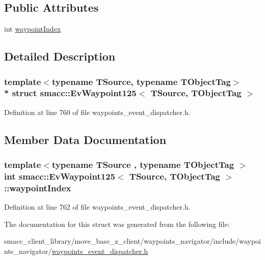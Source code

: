 \subsection*{Public Attributes}
\begin{DoxyCompactItemize}
\item 
int \hyperlink{structsmacc_1_1EvWaypoint125_a2131ce9d50a0a86de527c9bcf547a1f9}{waypoint\+Index}
\end{DoxyCompactItemize}


\subsection{Detailed Description}
\subsubsection*{template$<$typename T\+Source, typename T\+Object\+Tag$>$\\*
struct smacc\+::\+Ev\+Waypoint125$<$ T\+Source, T\+Object\+Tag $>$}



Definition at line 760 of file waypoints\+\_\+event\+\_\+dispatcher.\+h.



\subsection{Member Data Documentation}
\subsubsection[{\texorpdfstring{waypoint\+Index}{waypointIndex}}]{\setlength{\rightskip}{0pt plus 5cm}template$<$typename T\+Source , typename T\+Object\+Tag $>$ int {\bf smacc\+::\+Ev\+Waypoint125}$<$ T\+Source, T\+Object\+Tag $>$\+::waypoint\+Index}\hypertarget{structsmacc_1_1EvWaypoint125_a2131ce9d50a0a86de527c9bcf547a1f9}{}\label{structsmacc_1_1EvWaypoint125_a2131ce9d50a0a86de527c9bcf547a1f9}


Definition at line 762 of file waypoints\+\_\+event\+\_\+dispatcher.\+h.



The documentation for this struct was generated from the following file\+:\begin{DoxyCompactItemize}
\item 
smacc\+\_\+client\+\_\+library/move\+\_\+base\+\_\+z\+\_\+client/waypoints\+\_\+navigator/include/waypoints\+\_\+navigator/\hyperlink{waypoints__event__dispatcher_8h}{waypoints\+\_\+event\+\_\+dispatcher.\+h}\end{DoxyCompactItemize}
